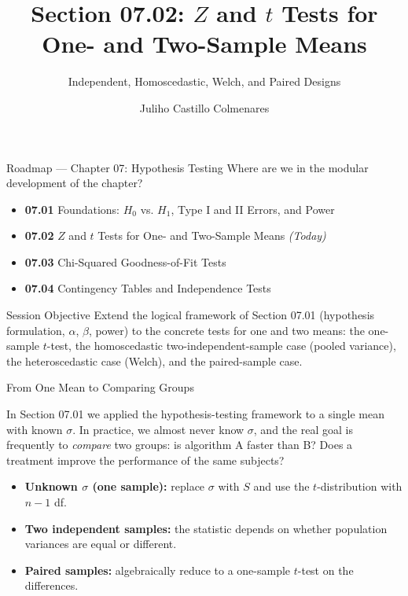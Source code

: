 \documentclass[10pt, aspectratio=169]{beamer}
\title[$Z$/$t$ Tests for Means]{Section 07.02: $Z$ and $t$ Tests for One- and Two-Sample Means}
\subtitle{Independent, Homoscedastic, Welch, and Paired Designs}
\author[J. Castillo Colmenares]{Juliho Castillo Colmenares}
\institute{Tecnológico de Monterrey}
\date{\vspace{-1.5cm}}
\begin{document}
\begin{frame}[plain]
  \titlepage
\end{frame}

\begin{frame}{Roadmap --- Chapter 07: Hypothesis Testing}
  \footnotesize
  Where are we in the modular development of the chapter? \pause
  \begin{itemize}\itemsep=0.08em
    \item \textbf{07.01} Foundations: $H_0$ vs. $H_1$, Type I and II Errors, and Power \pause
    \item \textbf{07.02} $Z$ and $t$ Tests for One- and Two-Sample Means \emph{(Today)} \pause
    \item \textbf{07.03} Chi-Squared Goodness-of-Fit Tests \pause
    \item \textbf{07.04} Contingency Tables and Independence Tests
  \end{itemize}
  \vspace{-0.05cm}
  \begin{block}{Session Objective}
    Extend the logical framework of Section 07.01 (hypothesis formulation, $\alpha$, $\beta$, power) to the concrete tests for one and two means: the one-sample $t$-test, the homoscedastic two-independent-sample case (pooled variance), the heteroscedastic case (Welch), and the paired-sample case.
  \end{block}
\end{frame}

\begin{frame}{From One Mean to Comparing Groups}
  \footnotesize
  \begin{motivacion}
    In Section 07.01 we applied the hypothesis-testing framework to a single mean with known $\sigma$. In practice, we almost never know $\sigma$, and the real goal is frequently to \emph{compare} two groups: is algorithm A faster than B? Does a treatment improve the performance of the same subjects?
  \end{motivacion}

  \vspace{0.15cm}
  \pause
  \begin{itemize}\itemsep=0.1cm
    \item \textbf{Unknown $\sigma$ (one sample):} replace $\sigma$ with $S$ and use the $t$-distribution with $n-1$ df. \pause
    \item \textbf{Two independent samples:} the statistic depends on whether population variances are equal or different. \pause
    \item \textbf{Paired samples:} algebraically reduce to a one-sample $t$-test on the differences.
  \end{itemize}
\end{frame}
\end{document}
